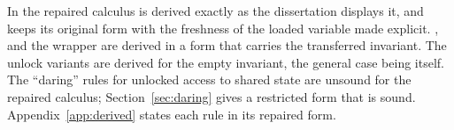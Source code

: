In the repaired calculus  is derived exactly as the
dissertation displays it, and  keeps its original form with the
freshness of the loaded variable made explicit. ,  and the
 wrapper are derived in a form that carries the transferred
invariant. The unlock variants are derived for the empty invariant, the
general case being  itself. The ``daring'' rules for unlocked
access to shared state are unsound for the repaired calculus;
Section~\ref{sec:daring} gives a restricted form that is sound. Appendix~\ref{app:derived}
states each rule in its repaired form.
